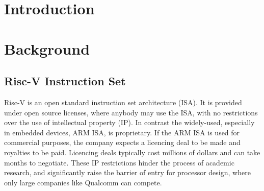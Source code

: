 \documentclass[a4paper,9pt]{report}
\begin{document}
\pagestyle{empty}
\singlespacing

\onehalfspacing

\singlespacing


\setcounter{page}{0}
\pagestyle{plain}
\tableofcontents
\listoffigures
\listoftables

\onehalfspacing


\chapter{Introduction}
\setcounter{page}{1} 









\chapter{Background} 
\section{Risc-V Instruction Set}
Risc-V is an open standard instruction set architecture (ISA). It is provided
under open source licenses, where anybody may use the ISA, with no restrictions
over the use of intellectual property (IP). In contrast the widely-used,
especially in embedded devices, ARM ISA, is proprietary. If the ARM ISA is used
for commercial purposes, the company expects a licencing deal to be made and
royalties to be paid. Licencing deals typically cost millions of dollars and can
take months to negotiate. These IP restrictions hinder the process of academic
research, and significantly raise the barrier of entry for processor design,
where only large companies like Qualcomm can compete.
\end{document}
